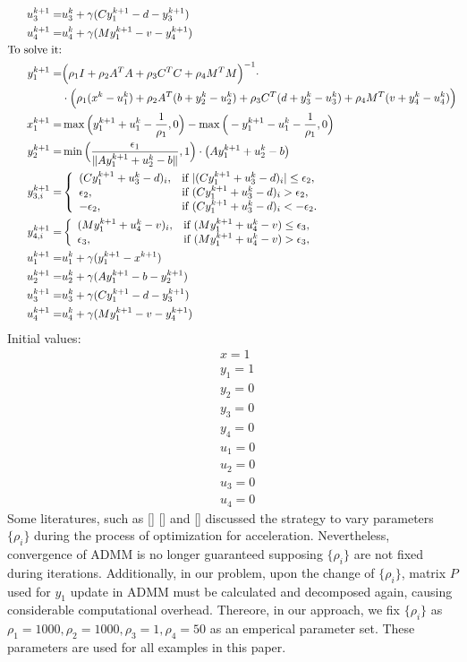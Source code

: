 \documentclass[annual]{acmsiggraph}
\begin{document}
\begin{align}
u_3^{k+1}=&u_3^k+\gamma(Cy_1^{k+1}-d-y_3^{k+1})\\
u_4^{k+1}=&u_4^k+\gamma(My_1^{k+1}-v-y_4^{k+1})\\
\mbox{To solve it:}\notag\\
y_1^{k+1}=&\Big( \rho_1 I+ \rho_2 A^TA+ \rho_3 C^TC+ \rho_4 M^TM\Big)^{-1}\cdot\notag\\
&\cdot\Big(\rho_1 (x^k-u_1^k)+\rho_2 A^T(b+y_2^k-u_2^k)+ \rho_3 C^T(d+y_3^k-u_3^k)+\rho_4 M^T(v+y_4^k-u_4^k)\Big)\\
x_1^{k+1}=&\max\Big(y_1^{k+1}+u_1^k-\frac{1}{\rho_1}, 0\Big) - \max\Big(-y_1^{k+1}-u_1^k-\frac{1}{\rho_1}, 0\Big)\\
y_2^{k+1}=&\min\Big(\frac{\epsilon_1}{\|Ay_1^{k+1}+u_2^k-b\|},1\Big)\cdot\big(Ay_1^{k+1}+u_2^k-b\big)\\
y_{3,i}^{k+1}=&\left\{
\begin{array}{ll}
(Cy_1^{k+1}+u_3^k-d)_i, &\mbox{if }|(Cy_1^{k+1}+u_3^k-d)_i|\leq\epsilon_2,\\
\epsilon_2, &\mbox{if }(Cy_1^{k+1}+u_3^k-d)_i>\epsilon_2,\\
-\epsilon_2, &\mbox{if }(Cy_1^{k+1}+u_3^k-d)_i<-\epsilon_2.\\
\end{array}
\right.\\
y_{4,i}^{k+1}=&\left\{
\begin{array}{ll}
(My_1^{k+1}+u_4^k-v)_i, &\mbox{if }(My_1^{k+1}+u_4^k-v)\leq\epsilon_3,\\
\epsilon_3, &\mbox{if }(My_1^{k+1}+u_4^k-v)>\epsilon_3,\\
\end{array}
\right.\\
u_1^{k+1}=&u_1^k+\gamma(y_1^{k+1}-x^{k+1})\\
u_2^{k+1}=&u_2^k+\gamma(Ay_1^{k+1}-b-y_2^{k+1})\\
u_3^{k+1}=&u_3^k+\gamma(Cy_1^{k+1}-d-y_3^{k+1})\\
u_4^{k+1}=&u_4^k+\gamma(My_1^{k+1}-v-y_4^{k+1})
\end{align}
Initial values:
\begin{align*}
&x=1\\
&y_1=1\\
&y_2=0\\
&y_3=0\\
&y_4=0\\
&u_1=0\\
&u_2=0\\
&u_3=0\\
&u_4=0
\end{align*}
Some literatures, such as [] [] and [] discussed the strategy to vary parameters $\{\rho_i\}$ during the process of optimization for acceleration. Nevertheless, convergence of ADMM is no longer guaranteed supposing $\{\rho_i\}$ are not fixed during iterations. Additionally, in our problem, upon the change of $\{\rho_i\}$, matrix $P$ used for $y_1$ update in ADMM must be calculated and decomposed again, causing considerable computational overhead. Thereore, in our approach, we fix $\{\rho_i\}$ as $\rho_1=1000, \rho_2=1000, \rho_3=1, \rho_4=50$ as an emperical parameter set. These parameters are used for all examples in this paper.


\end{document}
